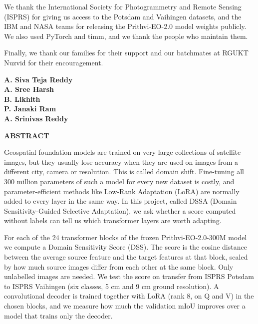 \documentclass[11pt,a4paper]{report}
\newif\ifblankpage
\newcommand{\blankpage}{%
  \clearpage\blankpagetrue\thispagestyle{empty}\null\clearpage
  \blankpagefalse\addtocounter{page}{-1}}
\begin{document}
We thank the International Society for Photogrammetry and Remote Sensing (ISPRS) for giving us access to the Potsdam and Vaihingen datasets, and the IBM and NASA teams for releasing the Prithvi-EO-2.0 model weights publicly. We also used PyTorch and timm, and we thank the people who maintain them.

Finally, we thank our families for their support and our batchmates at RGUKT Nuzvid for their encouragement.

\vspace{1.5cm}
\begin{flushright}
\textbf{A. Siva Teja Reddy}\\
\textbf{A. Sree Harsh}\\
\textbf{B. Likhith}\\
\textbf{P. Janaki Ram}\\
\textbf{A. Srinivas Reddy}
\end{flushright}

\blankpage

\begin{center}
\textbf{\Large ABSTRACT}
\end{center}

\vspace{0.5cm}
Geospatial foundation models are trained on very large collections of satellite images, but they usually lose accuracy when they are used on images from a different city, camera or resolution. This is called domain shift. Fine-tuning all 300 million parameters of such a model for every new dataset is costly, and parameter-efficient methods like Low-Rank Adaptation (LoRA) are normally added to every layer in the same way. In this project, called DSSA (Domain Sensitivity-Guided Selective Adaptation), we ask whether a score computed without labels can tell us which transformer layers are worth adapting.

For each of the 24 transformer blocks of the frozen Prithvi-EO-2.0-300M model we compute a Domain Sensitivity Score (DSS). The score is the cosine distance between the average source feature and the target features at that block, scaled by how much source images differ from each other at the same block. Only unlabelled images are needed. We test the score on transfer from ISPRS Potsdam to ISPRS Vaihingen (six classes, 5 cm and 9 cm ground resolution). A convolutional decoder is trained together with LoRA (rank 8, on Q and V) in the chosen blocks, and we measure how much the validation mIoU improves over a model that trains only the decoder.
\end{document}

